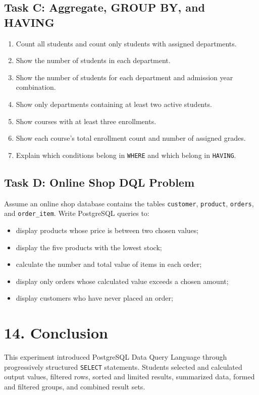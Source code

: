 \documentclass[12pt,a4paper]{article}
\begin{document}
\subsection*{Task C: Aggregate, GROUP BY, and HAVING}
\begin{enumerate}
    \item Count all students and count only students with assigned departments.
    \item Show the number of students in each department.
    \item Show the number of students for each department and admission year combination.
    \item Show only departments containing at least two active students.
    \item Show courses with at least three enrollments.
    \item Show each course's total enrollment count and number of assigned grades.
    \item Explain which conditions belong in \texttt{WHERE} and which belong in \texttt{HAVING}.
\end{enumerate}

\subsection*{Task D: Online Shop DQL Problem}
Assume an online shop database contains the tables \texttt{customer}, \texttt{product},
\texttt{orders}, and \texttt{order\_item}. Write PostgreSQL queries to:
\begin{itemize}
    \item display products whose price is between two chosen values;
    \item display the five products with the lowest stock;
    \item calculate the number and total value of items in each order;
    \item display only orders whose calculated value exceeds a chosen amount;
    \item display customers who have never placed an order;
\end{itemize}

\section*{14. Conclusion}
This experiment introduced PostgreSQL Data Query Language through progressively structured
\texttt{SELECT} statements. Students selected and calculated output values, filtered rows, sorted
and limited results, summarized data, formed and filtered groups, and combined result sets.
\end{document}
